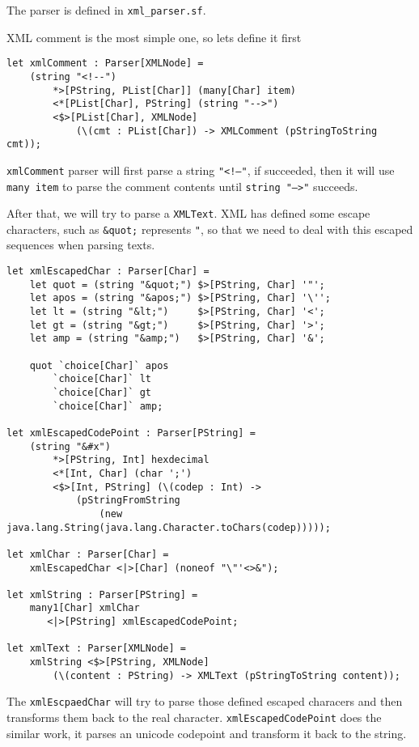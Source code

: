 The parser is defined in \texttt{xml\_parser.sf}.

XML comment is the most simple one, so lets define it first

\begin{lstlisting}
let xmlComment : Parser[XMLNode] =
    (string "<!--")
        *>[PString, PList[Char]] (many[Char] item)
        <*[PList[Char], PString] (string "-->")
        <$>[PList[Char], XMLNode]
            (\(cmt : PList[Char]) -> XMLComment (pStringToString cmt));
\end{lstlisting}

\texttt{xmlComment} parser will first parse a string \texttt{"\textless!--"}, if succeeded, then it will use \texttt{many item} to parse the comment contents until \texttt{string "--\textgreater"} succeeds.

After that, we will try to parse a \texttt{XMLText}. XML has defined some escape characters, such as \texttt{\&quot;} represents \texttt{"}, so that we need to deal with this escaped sequences when parsing texts.

\begin{lstlisting}
let xmlEscapedChar : Parser[Char] =
    let quot = (string "&quot;") $>[PString, Char] '"';
    let apos = (string "&apos;") $>[PString, Char] '\'';
    let lt = (string "&lt;")     $>[PString, Char] '<';
    let gt = (string "&gt;")     $>[PString, Char] '>';
    let amp = (string "&amp;")   $>[PString, Char] '&';

    quot `choice[Char]` apos
        `choice[Char]` lt
        `choice[Char]` gt
        `choice[Char]` amp;

let xmlEscapedCodePoint : Parser[PString] =
    (string "&#x")
        *>[PString, Int] hexdecimal
        <*[Int, Char] (char ';')
        <$>[Int, PString] (\(codep : Int) ->
            (pStringFromString
                (new java.lang.String(java.lang.Character.toChars(codep)))));

let xmlChar : Parser[Char] =
    xmlEscapedChar <|>[Char] (noneof "\"'<>&");

let xmlString : Parser[PString] =
    many1[Char] xmlChar
       <|>[PString] xmlEscapedCodePoint;

let xmlText : Parser[XMLNode] =
    xmlString <$>[PString, XMLNode]
        (\(content : PString) -> XMLText (pStringToString content));
\end{lstlisting}

The \texttt{xmlEscpaedChar} will try to parse those defined escaped characers and then transforms them back to the real character. \texttt{xmlEscapedCodePoint} does the similar work, it parses an unicode codepoint and transform it back to the string.


